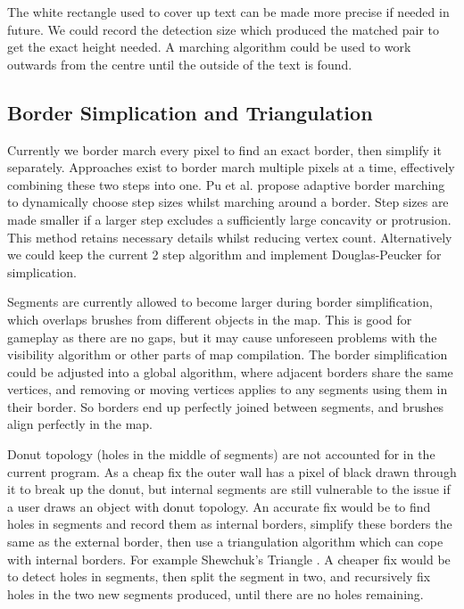 \documentclass[11pt]{IEEEtran}
\begin{document}
The white rectangle used to cover up text can be made more precise if needed in future. We could record the detection size which produced the matched pair to get the exact height needed. A marching algorithm could be used to work outwards from the centre until the outside of the text is found.

\subsection{Border Simplication and Triangulation}

Currently we border march every pixel to find an exact border, then simplify it separately. Approaches exist to border march multiple pixels at a time, effectively combining these two steps into one. Pu et al. \cite{pu2008adaptive} propose adaptive border marching to dynamically choose step sizes whilst marching around a border. Step sizes are made smaller if a larger step excludes a sufficiently large concavity or protrusion. This method retains necessary details whilst reducing vertex count. Alternatively we could keep the current 2 step algorithm and implement Douglas-Peucker \cite{douglas1973algorithms} for simplication.

Segments are currently allowed to become larger during border simplification, which overlaps brushes from different objects in the map. This is good for gameplay as there are no gaps, but it may cause unforeseen problems with the visibility algorithm or other parts of map compilation. The border simplification could be adjusted into a global algorithm, where adjacent borders share the same vertices, and removing or moving vertices applies to any segments using them in their border. So borders end up perfectly joined between segments, and brushes align perfectly in the map.

Donut topology (holes in the middle of segments) are not accounted for in the current program. As a cheap fix the outer wall has a pixel of black drawn through it to break up the donut, but internal segments are still vulnerable to the issue if a user draws an object with donut topology. An accurate fix would be to find holes in segments and record them as internal borders, simplify these borders the same as the external border, then use a triangulation algorithm which can cope with internal borders. For example Shewchuk's Triangle \cite{shewchuk2005two}. A cheaper fix would be to detect holes in segments, then split the segment in two, and recursively fix holes in the two new segments produced, until there are no holes remaining.
\end{document}
